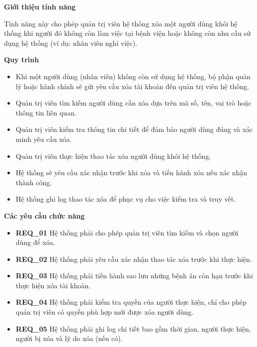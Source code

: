 \noindent \textbf{Giới thiệu tính năng}

Tính năng này cho phép quản trị viên hệ thống xóa một người dùng khỏi hệ thống khi người đó không còn làm việc tại bệnh viện hoặc không còn nhu cầu sử dụng hệ thống (ví dụ: nhân viên nghỉ việc).

\noindent \textbf{Quy trình}

\begin{itemize}

  \item Khi một người dùng (nhân viên) không còn sử dụng hệ thống, bộ phận quản lý hoặc hành chính sẽ gửi yêu cầu xóa tài khoản đến quản trị viên hệ thống.

  \item Quản trị viên tìm kiếm người dùng cần xóa dựa trên mã số, tên, vai trò hoặc thông tin liên quan.

  \item Quản trị viên kiểm tra thông tin chi tiết để đảm bảo người dùng đúng và xác minh yêu cầu xóa.

  \item Quản trị viên thực hiện thao tác xóa người dùng khỏi hệ thống.

  \item Hệ thống sẽ yêu cầu xác nhận trước khi xóa và tiến hành xóa nếu xác nhận thành công.

  \item Hệ thống ghi log thao tác xóa để phục vụ cho việc kiểm tra và truy vết.

\end{itemize}

\noindent \textbf{Các yêu cầu chức năng}

\begin{itemize}

  \item \textbf{REQ\_01} Hệ thống phải cho phép quản trị viên tìm kiếm và chọn người dùng để xóa.

  \item \textbf{REQ\_02} Hệ thống phải yêu cầu xác nhận thao tác xóa trước khi thực hiện.

  \item \textbf{REQ\_03} Hệ thống phải tiến hành sao lưu những bệnh án còn hạn trước khi thực hiện xóa tài khoản.

  \item \textbf{REQ\_04} Hệ thống phải kiểm tra quyền của người thực hiện, chỉ cho phép quản trị viên có quyền phù hợp mới được xóa người dùng.

  \item \textbf{REQ\_05} Hệ thống phải ghi log chi tiết bao gồm thời gian, người thực hiện, người bị xóa và lý do xóa (nếu có).
\end{itemize}
